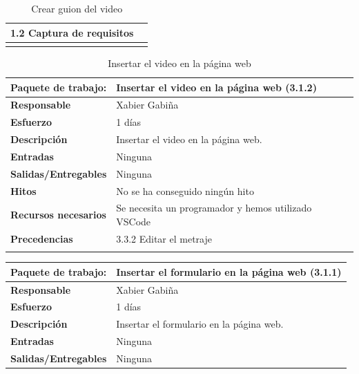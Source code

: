 \documentclass{report}
\begin{document}
\begin{center}
\begin{longtable}{|p{6cm}|p{6cm}|}
                                            1.2 Captura de requisitos\\
                    \hline
                    \caption{Crear guion del video}
                \end{longtable}
                \begin{longtable}{|p{6cm}|p{6cm}|}
                    \hline
                    \textbf{Paquete de trabajo:} & Insertar el video en la página web (3.1.2)\\
                    \hline
                    \textbf{Responsable} & Xabier Gabiña\\
                    \hline
                    \textbf{Esfuerzo} & 1 días\\
                    \hline
                    \textbf{Descripción} & Insertar el video en la página web.\\
                    \hline
                    \textbf{Entradas} & Ninguna\\
                    \hline
                    \textbf{Salidas/Entregables} & Ninguna \\
                    \hline
                    \textbf{Hitos} & No se ha conseguido ningún hito\\
                    \hline
                    \textbf{Recursos necesarios} & Se necesita un programador y hemos utilizado VSCode\\
                    \hline
                    \textbf{Precedencias} & 3.3.2 Editar el metraje\\
                    \hline
                    \caption{Insertar el video en la página web}
                \end{longtable}
                \clearpage
                \begin{longtable}{|p{6cm}|p{6cm}|}
                    \hline
                    \textbf{Paquete de trabajo:} & Insertar el formulario en la página web (3.1.1)\\
                    \hline
                    \textbf{Responsable} & Xabier Gabiña\\
                    \hline
                    \textbf{Esfuerzo} & 1 días\\
                    \hline
                    \textbf{Descripción} & Insertar el formulario en la página web.\\
                    \hline
                    \textbf{Entradas} & Ninguna\\
                    \hline
                    \textbf{Salidas/Entregables} & Ninguna \\

\end{longtable}
\end{center}
\end{document}
